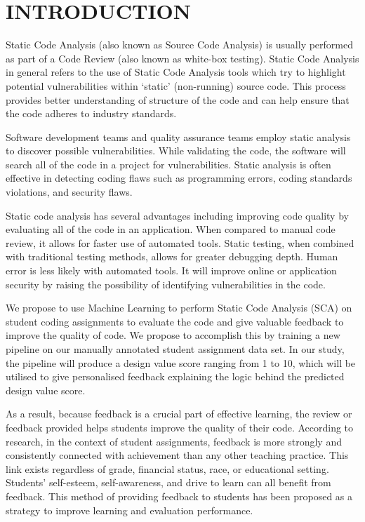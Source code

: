 
\chapter{INTRODUCTION} %
Static Code Analysis (also known as Source Code Analysis) is
usually performed as part of a Code Review (also known as
white-box testing). Static Code Analysis in general refers to
the use of Static Code Analysis tools which try to highlight
potential vulnerabilities within `static' (non-running)
source code. This process provides better understanding of
structure of the code and can help ensure that the code
adheres to industry standards.

Software development teams and quality assurance teams employ
static analysis to discover possible vulnerabilities.  While
validating the code, the software will search all of the code
in a project for vulnerabilities. Static analysis is often
effective in detecting coding flaws such as programming
errors, coding standards violations, and security flaws.

Static code analysis has several advantages including
improving code quality by evaluating all of the code in an
application. When compared to manual code review, it allows
for faster use of automated tools. Static testing, when
combined with traditional testing methods, allows for greater
debugging depth. Human error is less likely with automated
tools. It will improve online or application security by
raising the possibility of identifying vulnerabilities in the
code.

We propose to use Machine Learning to perform Static Code
Analysis (SCA) on student coding assignments to evaluate the
code and give valuable feedback to improve the quality of
code. We propose to accomplish this by training a new
pipeline on our manually annotated student assignment data
set. In our study, the pipeline will produce a design value
score ranging from 1 to 10, which will be utilised to give
personalised feedback explaining the logic behind the
predicted design value score.

As a result, because feedback is a crucial part of effective
learning, the review or feedback provided helps students
improve the quality of their code. According to research, in
the context of student assignments, feedback is more strongly
and consistently connected with achievement than any other
teaching practice. This link exists regardless of grade,
financial status, race, or educational setting. Students'
self-esteem, self-awareness, and drive to learn can all
benefit from feedback. This method of providing feedback to
students has been proposed as a strategy to improve learning
and evaluation performance.
